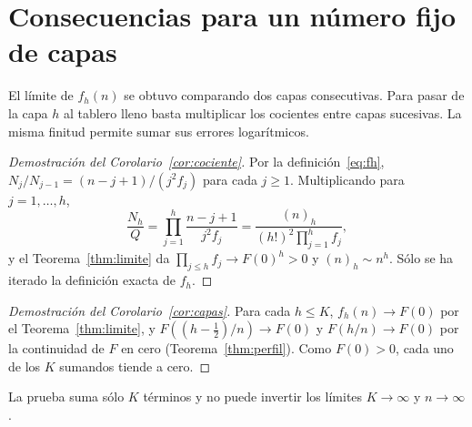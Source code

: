 \section{Consecuencias para un número fijo de capas}\label{sec:corolarios}

El límite de $f_h(n)$ se obtuvo comparando dos capas consecutivas. Para pasar de la capa
$h$ al tablero lleno basta multiplicar los cocientes entre capas sucesivas.
La misma finitud permite sumar sus errores logarítmicos.

\begin{proof}[Demostración del Corolario~\ref{cor:cociente}]
Por la definición~\eqref{eq:fh}, $N_j/N_{j-1}=(n-j+1)/(j^2f_j)$ para cada $j\ge1$. Multiplicando
para $j=1,\dots,h$,
\[
 \frac{N_h}{Q}=\prod_{j=1}^h\frac{n-j+1}{j^2f_j}=\frac{(n)_h}{(h!)^2\prod_{j=1}^hf_j},
\]
y el Teorema~\ref{thm:limite} da $\prod_{j\le h}f_j\to F(0)^h>0$ y $(n)_h\sim n^h$. Sólo se ha
iterado la definición exacta de $f_h$.
\end{proof}

\begin{proof}[Demostración del Corolario~\ref{cor:capas}]
Para cada $h\le K$, $f_h(n)\to F(0)$ por el Teorema~\ref{thm:limite}, y
$F((h-\frac12)/n)\to F(0)$ y $F(h/n)\to F(0)$ por la continuidad de $F$ en cero
(Teorema~\ref{thm:perfil}). Como $F(0)>0$, cada uno de los $K$ sumandos tiende a cero.
\end{proof}

La prueba suma sólo $K$ términos y no puede invertir los límites $K\to\infty$ y $n\to\infty$.
